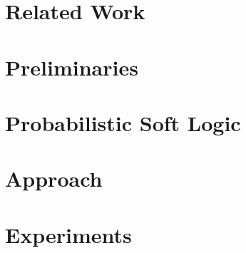\documentclass{sig-alternate}
\begin{document}
\section{Related Work}


\section{Preliminaries}


\section{Probabilistic Soft Logic}

\label{section:PSL}

\section{Approach}



\section{Experiments}



\end{document}
